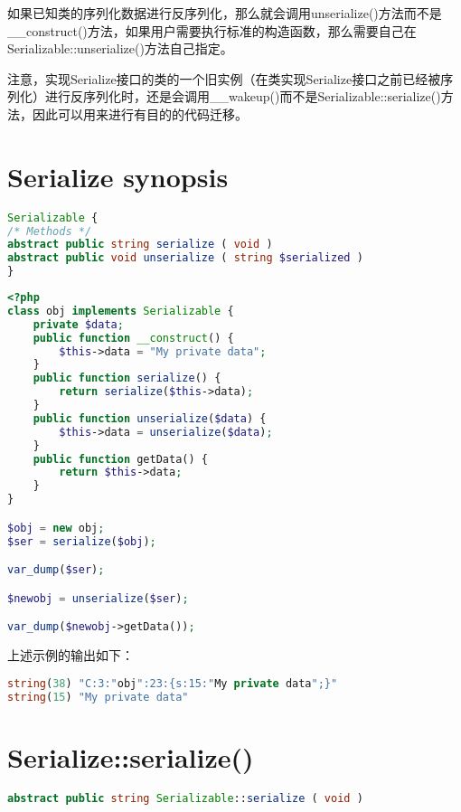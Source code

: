 如果已知类的序列化数据进行反序列化，那么就会调用unserialize()方法而不是\_\_construct()方法，如果用户需要执行标准的构造函数，那么需要自己在Serializable::unserialize()方法自己指定。

注意，实现Serialize接口的类的一个旧实例（在类实现Serialize接口之前已经被序列化）进行反序列化时，还是会调用\_\_wakeup()而不是Serializable::serialize()方法，因此可以用来进行有目的的代码迁移。




\section{Serialize synopsis}


\begin{lstlisting}[language=PHP]
Serializable {
/* Methods */
abstract public string serialize ( void )
abstract public void unserialize ( string $serialized )
}
\end{lstlisting}



\begin{lstlisting}[language=PHP]
<?php
class obj implements Serializable {
    private $data;
    public function __construct() {
        $this->data = "My private data";
    }
    public function serialize() {
        return serialize($this->data);
    }
    public function unserialize($data) {
        $this->data = unserialize($data);
    }
    public function getData() {
        return $this->data;
    }
}

$obj = new obj;
$ser = serialize($obj);

var_dump($ser);

$newobj = unserialize($ser);

var_dump($newobj->getData());
\end{lstlisting}

上述示例的输出如下：


\begin{lstlisting}[language=PHP]
string(38) "C:3:"obj":23:{s:15:"My private data";}"
string(15) "My private data"
\end{lstlisting}

\section{Serialize::serialize()}




\begin{lstlisting}[language=PHP]
abstract public string Serializable::serialize ( void )
\end{lstlisting}

